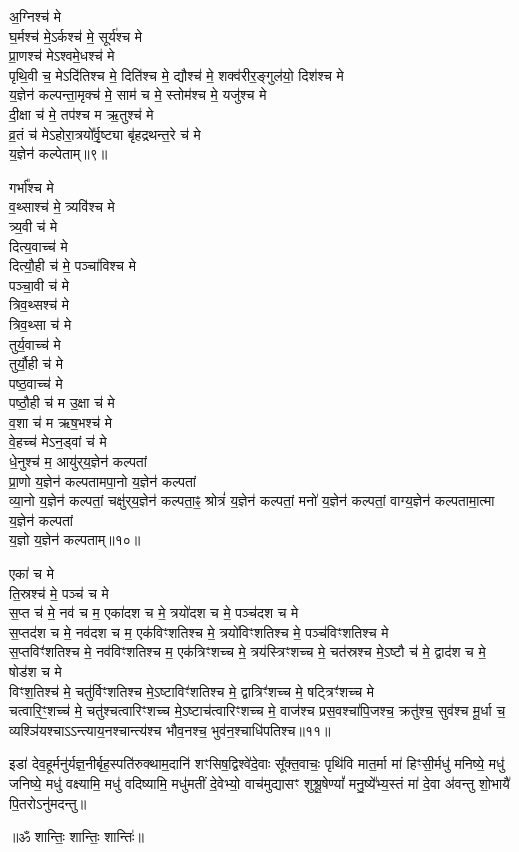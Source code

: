 अ॒ग्निश्च॑ मे\\
घ॒र्मश्च॑ मे॒ऽर्कश्च॑ मे॒ सूर्य॑श्च मे\\
प्रा॒णश्च॑ मेऽश्वमे॒धश्च॑ मे\\
पृथि॒वी च॒ मेऽदि॑तिश्च मे॒ दिति॑श्च मे॒ द्यौश्च॑ मे॒ शक्व॑रीर॒ङ्गुल॑यो॒ दिश॑श्च मे\\
य॒ज्ञेन॑ कल्पन्ता॒मृक्च॑ मे॒ साम॑ च मे॒ स्तोम॑श्च मे॒ यजु॑श्च मे\\
दी॒क्षा च॑ मे॒ तप॑श्च म ऋ॒तुश्च॑ मे\\
व्र॒तं च॑ मेऽहोरा॒त्रयो᳚र्वृ॒ष्ट्या बृ॑हद्रथन्त॒रे च॑ मे\\
य॒ज्ञेन॑ कल्पेताम्॥९॥ 

गर्भा᳚श्च मे\\
व॒थ्साश्च॑ मे॒ त्र्यवि॑श्च मे\\
त्र्य॒वी च॑ मे\\
दित्य॒वाच्च॑ मे\\
दित्यौ॒ही च॑ मे॒ पञ्चा॑विश्च मे\\
पञ्चा॒वी च॑ मे\\
त्रिव॒थ्सश्च॑ मे\\
त्रिव॒थ्सा च॑ मे\\
तुर्य॒वाच्च॑ मे\\
तुर्यौ॒ही च॑ मे\\
पष्ठ॒वाच्च॑ मे\\
पष्ठौ॒ही च॑ म उ॒क्षा च॑ मे\\
व॒शा च॑ म ऋष॒भश्च॑ मे\\
वे॒हच्च॑ मेऽन॒ड्वां च॑ मे\\
धे॒नुश्च॑ म॒ आयु॑र्‌य॒ज्ञेन॑ कल्पतां\\
प्रा॒णो य॒ज्ञेन॑ कल्पतामपा॒नो य॒ज्ञेन॑ कल्पतां\\
व्या॒नो य॒ज्ञेन॑ कल्पतां॒ चक्षु॑र्‌य॒ज्ञेन॑ कल्पता॒ꣴ॒ श्रोत्रं॑ य॒ज्ञेन॑ कल्पतां॒ मनो॑ य॒ज्ञेन॑ कल्पतां॒ वाग्य॒ज्ञेन॑ कल्पतामा॒त्मा य॒ज्ञेन॑ कल्पतां\\
य॒ज्ञो य॒ज्ञेन॑ कल्पताम्॥१०॥ 

एका॑ च मे\\
ति॒स्रश्च॑ मे॒ पञ्च॑ च मे\\
स॒प्त च॑ मे॒ नव॑ च म॒ एका॑दश च मे॒ त्रयो॑दश च मे॒ पञ्च॑दश च मे\\
स॒प्तद॑श च मे॒ नव॑दश च म॒ एक॑विꣳशतिश्च मे॒ त्रयो॑विꣳशतिश्च मे॒ पञ्च॑विꣳशतिश्च मे\\
स॒प्तविꣳ॑शतिश्च मे॒ नव॑विꣳशतिश्च म॒ एक॑त्रिꣳशच्च मे॒ त्रय॑स्त्रिꣳशच्च मे॒ चत॑स्रश्च मे॒ऽष्टौ च॑ मे॒ द्वाद॑श च मे॒ षोड॑श च मे\\
विꣳश॒तिश्च॑ मे॒ चतु॑र्विꣳशतिश्च मे॒ऽष्टाविꣳ॑शतिश्च मे॒ द्वात्रिꣳ॑शच्च मे॒ षट्त्रिꣳ॑शच्च मे\\
चत्वारि॒ꣳ॒शच्च॑ मे॒ चतु॑श्चत्वारिꣳशच्च मे॒ऽष्टाच॑त्वारिꣳशच्च मे॒ वाज॑श्च प्रस॒वश्चा॑पि॒जश्च॒ क्रतु॑श्च॒ सुव॑श्च मू॒र्धा च॒ व्यश्ञि॑यश्चाऽऽन्त्याय॒नश्चान्त्य॑श्च भौव॒नश्च॒ भुव॑न॒श्चाधि॑पतिश्च॥११॥ 

इडा॑ देव॒हूर्मनु॑र्यज्ञ॒नीर्बृह॒स्पति॑रुक्थाम॒दानि॑ शꣳसिष॒द्विश्वे॑दे॒वाः सू᳚क्त॒वाचः॒ पृथि॑वि मात॒र्मा मा॑ हिꣳसी॒र्मधु॑ मनिष्ये॒ मधु॑ जनिष्ये॒ मधु॑ वक्ष्यामि॒ मधु॑ वदिष्यामि॒ मधु॑मतीं दे॒वेभ्यो॒ वाच॑मुद्यासꣳ शुश्रू॒षेण्यां᳚ मनु॒ष्ये᳚भ्य॒स्तं मा॑ दे॒वा अ॑वन्तु शो॒भायै॑ पि॒तरोऽनु॑मदन्तु॥ 

\centerline{॥ॐ शान्तिः॒ शान्तिः॒ शान्तिः॑॥}


